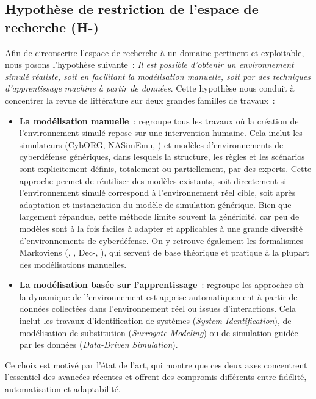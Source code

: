 \subsection*{Hypothèse de restriction de l’espace de recherche (H-)}

Afin de circonscrire l’espace de recherche à un domaine pertinent et exploitable, nous posons l’hypothèse suivante~: \textit{Il est possible d’obtenir un environnement simulé réaliste, soit en facilitant la modélisation manuelle, soit par des techniques d’apprentissage machine à partir de données}. Cette hypothèse nous conduit à concentrer la revue de littérature sur deux grandes familles de travaux~:

\begin{itemize}
  \item \textbf{La modélisation manuelle}~: regroupe tous les travaux où la création de l’environnement simulé repose sur une intervention humaine. Cela inclut les simulateurs (CybORG, NASimEmu, ) et modèles d’environnements de cyberdéfense génériques, dans lesquels la structure, les règles et les scénarios sont explicitement définis, totalement ou partiellement, par des experts. Cette approche permet de réutiliser des modèles existants, soit directement si l’environnement simulé correspond à l’environnement réel cible, soit après adaptation et instanciation du modèle de simulation générique. Bien que largement répandue, cette méthode limite souvent la généricité, car peu de modèles sont à la fois faciles à adapter et applicables à une grande diversité d’environnements de cyberdéfense. On y retrouve également les formalismes Markoviens (, , Dec-, ), qui servent de base théorique et pratique à la plupart des modélisations manuelles.
  \item \textbf{La modélisation basée sur l'apprentissage}~: regroupe les approches où la dynamique de l’environnement est apprise automatiquement à partir de données collectées dans l’environnement réel ou issues d’interactions. Cela inclut les travaux d’identification de systèmes (\textit{System Identification}), de modélisation de substitution (\textit{Surrogate Modeling}) ou de simulation guidée par les données (\textit{Data-Driven Simulation}).
\end{itemize}

Ce choix est motivé par l’état de l’art, qui montre que ces deux axes concentrent l’essentiel des avancées récentes et offrent des compromis différents entre fidélité, automatisation et adaptabilité.

